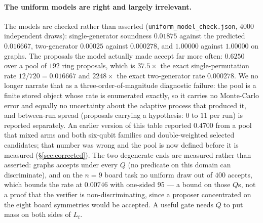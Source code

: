 \documentclass[11pt]{article}
\begin{document}
\paragraph{The uniform models are right and largely irrelevant.} The models are checked rather than
asserted (\texttt{uniform\_model\_check.json}, $4000$ independent draws): single-generator soundness
$0.01875$ against the predicted $0.016667$, two-generator $0.00025$ against $0.000278$, and
$1.00000$ against $1.00000$ on graphs. The proposals the model actually made accept far more often:
$0.6250$ over a pool of $192$ ring proposals, which is $37.5\times$ the exact single-permutation
rate $12/720 = 0.016667$ and $2248\times$ the exact two-generator rate $0.000278$. We no longer
narrate that as a three-order-of-magnitude diagnostic failure: the pool is a finite stored object
whose rate is enumerated exactly, so it carries no Monte-Carlo error and equally no uncertainty
about the adaptive process that produced it, and between-run spread (proposals carrying a
hypothesis: $0$ to $11$ per run) is reported separately. An earlier version of this table reported
$0.4700$ from a pool that mixed arms and both six-qubit families and double-weighted selected
candidates; that number was wrong and the pool is now defined before it is measured
(\S\ref{sec:corrected}). The two degenerate ends are measured rather than asserted: graphs accepts
under every $Q$ (no predicate on this domain can discriminate), and on the $n=9$ board task no
uniform draw out of $400$ accepts, which bounds the rate at $0.00746$ with one-sided 95%
--- a bound on those $Q$s, not a proof that the verifier is non-discriminating, since a proposer
concentrated on the eight board symmetries would be accepted. A useful gate needs $Q$ to put mass on
both sides of $L_t$.
\end{document}
